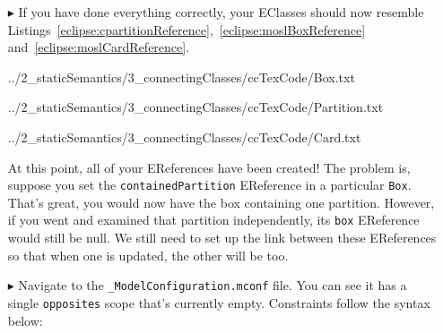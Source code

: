 \begin{itemize}
\vspace{0.5cm}

\item[$\blacktriangleright$] If you have done everything correctly, your EClasses should now resemble Listings~\ref{eclipse:cpartitionReference},~\ref{eclipse:moslBoxReference} and~\ref{eclipse:moslCardReference}. 

\vspace{0.5cm}

 {../2_staticSemantics/3_connectingClasses/ccTexCode/Box.txt} 


\vspace{0.5cm}

 {../2_staticSemantics/3_connectingClasses/ccTexCode/Partition.txt} 


\vspace{0.5cm}

 {../2_staticSemantics/3_connectingClasses/ccTexCode/Card.txt} 


\clearpage

At this point, all of your EReferences have been created! The problem is, suppose you set the \texttt{containedPartition} EReference in a particular
\texttt{Box}. That's great, you would now have the box containing one partition. However, if you went and examined that partition independently, its
\texttt{box} EReference would still be null. We still need to set up the link between these EReferences so that when one is updated, the other will be too.

\vspace{0.5cm}

\item[$\blacktriangleright$] Navigate to the \texttt{\_ModelConfiguration.mconf} file. You can see it has a single \texttt{opposites} scope that's currently empty.
Constraints follow the syntax below: 



\end{itemize}
